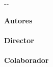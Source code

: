 {\begin{cambiamargen}{-\cambioIzquierdo}{-\cambioDerecho}
\begin{center}
\end{center}

\vfill

\begin{large}
\begin{center}
{\Large \bfseries Autores}\\
\textbf{\autorPortadaVal}\\[0.5cm]
{\Large \bfseries Director}\\
\textbf{\directorPortadaVal}\\[0.5cm]
\ifx\colaboradorPortadaVal\empty\else
{\Large \bfseries Colaborador}\\
\textbf{\colaboradorPortadaVal}\\[0.5cm]
\fi
\textbf{\institucionVal}\\[1em]
\end{center}
\end{large}

\vfill

\end{cambiamargen}

\newpage

\thispagestyle{empty}
\mbox{ }


\newpage

\thispagestyle{empty}

\mbox{ }

\begin{Huge}
\begin{center}
\tituloPortadaVal \\
\tituloPortadaEngVal
\end{center}
\end{Huge}

}
